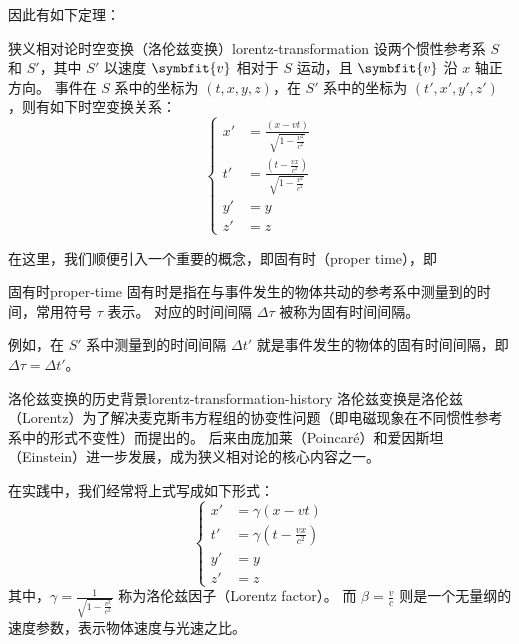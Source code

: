 因此有如下定理：
\begin{theorem}{狭义相对论时空变换（洛伦兹变换）}{lorentz-transformation}
    设两个惯性参考系 $S$ 和 $S'$，其中 $S'$ 以速度 $\symbfit{v}$ 相对于 $S$ 运动，且 $\symbfit{v}$ 沿 $x$ 轴正方向。
    事件在 $S$ 系中的坐标为 $(t, x, y, z)$，在 $S'$ 系中的坐标为 $(t', x', y', z')$，则有如下时空变换关系：
    \begin{equation}
        \left\{
        \begin{aligned}
            x' & = \frac{(x - v t)}{\sqrt{1 - \frac{v^2}{c^2}}}                        \\
            t' & = \frac{\left(t - \frac{v x}{c^2}\right)}{\sqrt{1 - \frac{v^2}{c^2}}} \\
            y' & = y                                                                   \\
            z' & = z
        \end{aligned}
        \right.
        \label{eq:lorentz-transformation}
    \end{equation}
\end{theorem}

在这里，我们顺便引入一个重要的概念，即固有时（proper time），即
\begin{definition}{固有时}{proper-time}
    固有时是指在与事件发生的物体共动的参考系中测量到的时间，常用符号 $\tau$ 表示。
    对应的时间间隔 $\Delta \tau$ 被称为固有时间间隔。

    例如，在 $S'$ 系中测量到的时间间隔 $\Delta t'$ 就是事件发生的物体的固有时间间隔，即 $\Delta \tau = \Delta t'$。
\end{definition}


\begin{note}{洛伦兹变换的历史背景}{lorentz-transformation-history}
    洛伦兹变换是洛伦兹（Lorentz）为了解决麦克斯韦方程组的协变性问题（即电磁现象在不同惯性参考系中的形式不变性）而提出的。
    后来由庞加莱（Poincaré）和爱因斯坦（Einstein）进一步发展，成为狭义相对论的核心内容之一。
\end{note}

在实践中，我们经常将上式写成如下形式：
\begin{equation}
    \left\{
    \begin{aligned}
        x' & = \gamma (x - v t)                        \\
        t' & = \gamma \left(t - \frac{v x}{c^2}\right) \\
        y' & = y                                       \\
        z' & = z
    \end{aligned}
    \right.
\end{equation}
其中，$ \gamma = \frac{1}{\sqrt{1 - \frac{v^2}{c^2}}} $ 称为洛伦兹因子（Lorentz factor）。
而 $ \beta = \frac{v}{c} $ 则是一个无量纲的速度参数，表示物体速度与光速之比。

